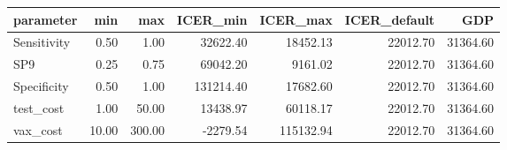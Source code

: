 \begin{tabular}{lrrrrrr}
  \hline
parameter & min & max & ICER\_min & ICER\_max & ICER\_default & GDP \\ 
  \hline
Sensitivity & 0.50 & 1.00 & 32622.40 & 18452.13 & 22012.70 & 31364.60 \\ 
  SP9 & 0.25 & 0.75 & 69042.20 & 9161.02 & 22012.70 & 31364.60 \\ 
  Specificity & 0.50 & 1.00 & 131214.40 & 17682.60 & 22012.70 & 31364.60 \\ 
  test\_cost & 1.00 & 50.00 & 13438.97 & 60118.17 & 22012.70 & 31364.60 \\ 
  vax\_cost & 10.00 & 300.00 & -2279.54 & 115132.94 & 22012.70 & 31364.60 \\ 
   \hline
\end{tabular}
